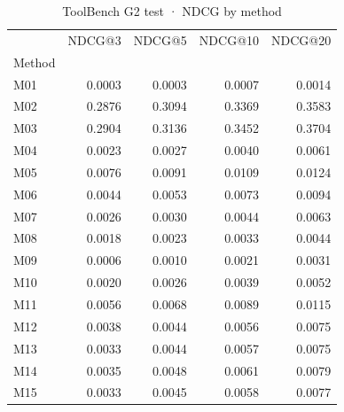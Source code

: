\begin{table}
\caption{ToolBench G2 test · NDCG by method}
\label{tab:ToolBench-G2-test-comparison-comparison-ndcg}
\begin{tabular}{lrrrr}
\toprule
 & NDCG@3 & NDCG@5 & NDCG@10 & NDCG@20 \\
Method &  &  &  &  \\
\midrule
M01 & 0.0003 & 0.0003 & 0.0007 & 0.0014 \\
M02 & 0.2876 & 0.3094 & 0.3369 & 0.3583 \\
M03 & 0.2904 & 0.3136 & 0.3452 & 0.3704 \\
M04 & 0.0023 & 0.0027 & 0.0040 & 0.0061 \\
M05 & 0.0076 & 0.0091 & 0.0109 & 0.0124 \\
M06 & 0.0044 & 0.0053 & 0.0073 & 0.0094 \\
M07 & 0.0026 & 0.0030 & 0.0044 & 0.0063 \\
M08 & 0.0018 & 0.0023 & 0.0033 & 0.0044 \\
M09 & 0.0006 & 0.0010 & 0.0021 & 0.0031 \\
M10 & 0.0020 & 0.0026 & 0.0039 & 0.0052 \\
M11 & 0.0056 & 0.0068 & 0.0089 & 0.0115 \\
M12 & 0.0038 & 0.0044 & 0.0056 & 0.0075 \\
M13 & 0.0033 & 0.0044 & 0.0057 & 0.0075 \\
M14 & 0.0035 & 0.0048 & 0.0061 & 0.0079 \\
M15 & 0.0033 & 0.0045 & 0.0058 & 0.0077 \\
\bottomrule
\end{tabular}
\end{table}

